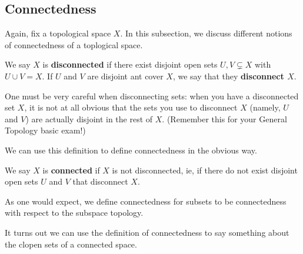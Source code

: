 \subsection{Connectedness}

Again, fix a topological space $X$. In this subsection, we discuss different notions of connectedness of a toplogical space.

\begin{boxdefinition}[Disconnectedness]
    We say $X$ is \textbf{disconnected} if there exist disjoint open sets $U, V \subsetneq X$ with $U \cup V = X$. If $U$ and $V$ are disjoint ant cover $X$, we say that they \textbf{disconnect $X$}.
\end{boxdefinition}
\begin{remark}
    One must be very careful when disconnecting sets: when you have a disconnected set $X$, it is not at all obvious that the sets you use to disconnect $X$ (namely, $U$ and $V$) are actually disjoint in the rest of $X$. (Remember this for your General Topology basic exam!)
\end{remark}

We can use this definition to define connectedness in the obvious way.

\begin{boxdefinition}[Connectedness]
    We say $X$ is \textbf{connected} if $X$ is not disconnected, ie, if there do not exist disjoint open sets $U$ and $V$ that disconnect $X$.
\end{boxdefinition}

As one would expect, we define connectedness for subsets to be connectedness with respect to the subspace topology.

It turns out we can use the definition of connectedness to say something about the clopen sets of a connected space.

